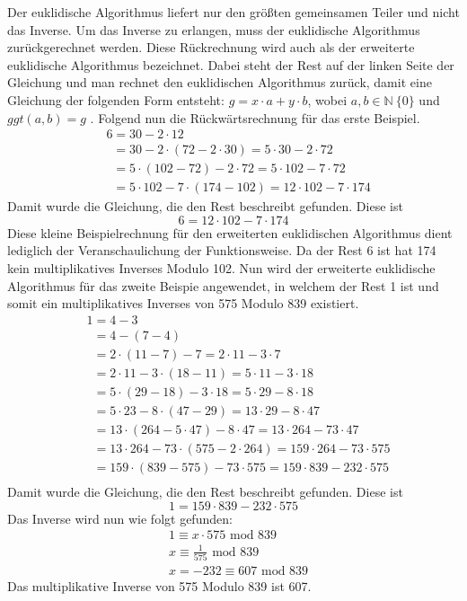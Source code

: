 Der euklidische Algorithmus liefert nur den größten gemeinsamen Teiler und nicht das Inverse. Um das Inverse zu erlangen, muss der euklidische Algorithmus zurückgerechnet werden. Diese Rückrechnung wird auch als der erweiterte euklidische Algorithmus bezeichnet. Dabei steht der Rest auf der linken Seite der Gleichung und man rechnet den euklidischen Algorithmus zurück, damit eine Gleichung der folgenden Form entsteht: $g = x \cdot a + y \cdot b$, wobei $a, b \in \mathbb{N} \ \{0\}$ und $ggt(a, b) = g$ \cite[S. 257]{Dr.ReinholdHubl.2022}. Folgend nun die Rückwärtsrechnung für das erste Beispiel.
\begin{align*}
&6 = 30 - 2 \cdot 12\\
&\enspace = 30 - 2 \cdot (72 - 2 \cdot 30) = 5 \cdot 30 - 2 \cdot 72\\
&\enspace = 5 \cdot (102 - 72) - 2 \cdot 72 = 5 \cdot 102 - 7 \cdot 72\\
&\enspace = 5 \cdot 102 - 7 \cdot (174 - 102) = 12 \cdot 102 -7 \cdot 174
\end{align*}
Damit wurde die Gleichung, die den Rest beschreibt gefunden. Diese ist $$6 = 12 \cdot 102 -7 \cdot 174$$ Diese kleine Beispielrechnung für den erweiterten euklidischen Algorithmus dient lediglich der Veranschaulichung der Funktionsweise. Da der Rest 6 ist hat 174 kein multiplikatives Inverses Modulo 102. Nun wird der erweiterte euklidische Algorithmus für das zweite Beispie angewendet, in welchem der Rest 1 ist und somit ein multiplikatives Inverses von 575 Modulo 839 existiert.
\begin{align*}
&1 = 4 - 3\\
&\enspace = 4 - (7 - 4)\\
&\enspace = 2 \cdot (11 - 7) - 7 = 2 \cdot 11 - 3 \cdot 7\\
&\enspace = 2 \cdot 11 - 3 \cdot (18 - 11) = 5 \cdot 11 - 3 \cdot 18\\
&\enspace = 5 \cdot (29 - 18) - 3 \cdot 18 = 5 \cdot 29 - 8 \cdot 18\\
&\enspace = 5 \cdot 23 - 8 \cdot (47 - 29) = 13 \cdot 29 - 8 \cdot 47\\
&\enspace = 13 \cdot (264 - 5 \cdot 47) - 8 \cdot 47 = 13 \cdot 264 - 73 \cdot 47\\
&\enspace = 13 \cdot 264 - 73 \cdot (575 - 2 \cdot 264) = 159 \cdot 264 - 73 \cdot 575\\
&\enspace = 159 \cdot (839 - 575) - 73 \cdot 575 = 159 \cdot 839 - 232 \cdot 575\\
\end{align*}
Damit wurde die Gleichung, die den Rest beschreibt gefunden. Diese ist $$1 = 159 \cdot 839 - 232 \cdot 575$$ Das Inverse wird nun wie folgt gefunden:
\begin{align*}
&1 \equiv x \cdot 575\text{ mod }839\\
&x \equiv \frac{1}{575}\text{ mod }839\\
&x = - 232 \equiv 607\text{ mod }839
\end{align*}
Das multiplikative Inverse von 575 Modulo 839 ist 607.\\

